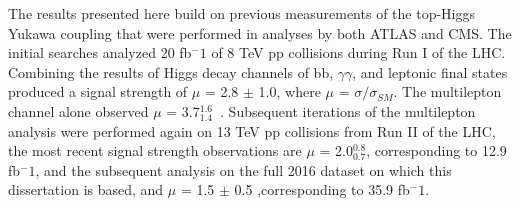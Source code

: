 
The results presented here build on previous measurements of the top-Higgs Yukawa coupling that were performed in \tth analyses by both ATLAS and CMS.
The initial searches analyzed 20 fb$^-1$ of 8 TeV pp collisions during Run I of the LHC. Combining the results of Higgs decay channels of bb, $\gamma\gamma$,
and leptonic final states produced a signal strength of $\mu$ = 2.8 $\pm$ 1.0, where $\mu$ = $\sigma/\sigma_{SM}$. The multilepton channel alone
observed $\mu$ = 3.7$^{1.6}_{1.4}$~\cite{jhep_tth}. Subsequent iterations of the multilepton analysis were performed again on 13 TeV pp collisions from Run II
of the LHC, the most recent signal strength observations are $\mu$ = 2.0$^{0.8}_{0.7}$, corresponding to 12.9 fb$^-1$, and the subsequent analysis on the full
2016 dataset on which this dissertation is based, and $\mu$ = 1.5 $\pm$ 0.5 ,corresponding to 35.9 fb$^-1$.


%
% 
% 
